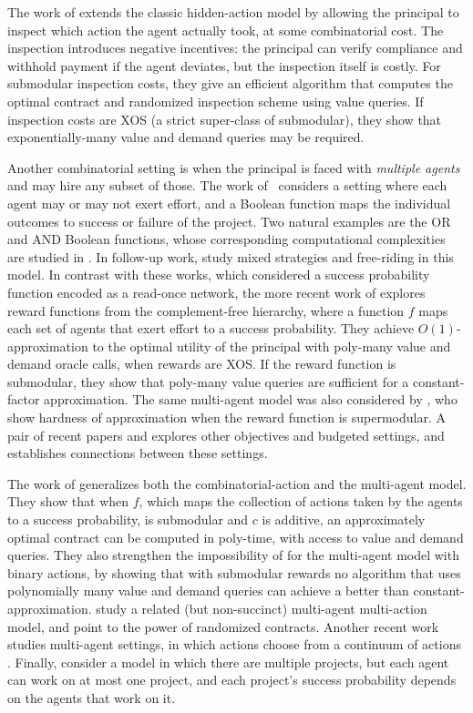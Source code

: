 \documentclass[11pt]{article}
\begin{document}
The work of \cite{contractsInspection} extends the classic hidden-action model by allowing the principal to inspect which action the agent actually took, at some combinatorial cost. The inspection introduces negative incentives: the principal can verify compliance and withhold payment if the agent deviates, but the inspection itself is costly.
For submodular inspection costs, they give an efficient algorithm that computes the optimal contract and randomized inspection scheme using value queries. If inspection costs are XOS (a strict super-class of submodular), they show that exponentially-many value and demand queries may be required.

Another combinatorial setting is when the principal is faced with \textit{multiple agents} and may hire any subset of those. 
The work of~\cite{babaioff2006combinatorial,babaioff2012combinatorialJET} considers a setting where each agent may or may not exert effort, and a Boolean function maps the individual outcomes to success or failure of the project. Two natural examples are the OR and AND Boolean functions, whose corresponding computational complexities are studied in \citep{babaioff2006combinatorial,EmekF12}.
In follow-up work, \cite{babaioff2009free,babaioff2006mixed} study mixed strategies and free-riding in this model.
In contrast with these works, which considered a success probability function encoded as a read-once network, the more recent work of \cite{duetting2022multi} explores reward functions from the complement-free hierarchy, where a function $f$ maps each set of agents that exert effort to a success probability. 
They achieve $O(1)$-approximation to the optimal utility of the principal with poly-many value and demand oracle calls, when rewards are XOS. If the reward function is submodular, they show that poly-many value queries are sufficient for a constant-factor approximation.
The same multi-agent model was also considered by \cite{deo2024supermodular}, who show hardness of approximation when the reward function is supermodular. A pair of recent papers \cite{FeldmanTPS25} and \cite{Aharoni0T25} explores other objectives and budgeted settings, and establishes connections between these settings.

The work of \cite{multimulti} generalizes both the combinatorial-action and the multi-agent model. They show that when $f$, which maps the collection of actions taken by the agents to a success probability, is submodular and $c$ is additive, an approximately optimal contract can be computed in poly-time, with access to value and demand queries. They also strengthen the impossibility of \cite{duetting2022multi} for the multi-agent model with binary actions, by showing that with submodular rewards no algorithm that uses polynomially many value and demand queries can achieve a better than constant-approximation. \cite{cacciamani2024multi} study a related (but non-succinct) 
multi-agent multi-action model, and point to the power of randomized contracts. Another recent work studies multi-agent settings, in which actions choose from a continuum of actions \cite{DasarathaGS25}. Finally, \cite{AlonCCELT25} consider a model in which there are multiple projects, but each agent can work on at most one project, and each project's success probability depends on the agents that work on it.
\end{document}
